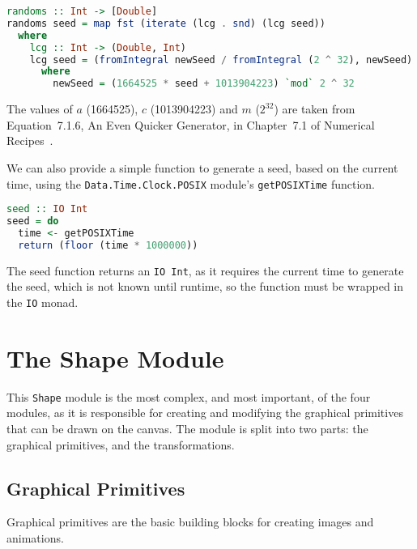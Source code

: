 \documentclass[../main.tex]{subfiles}
\begin{document}
            \begin{lstlisting}[language=Haskell, label={lst:random}, caption={The random number
                generator, which uses a linear congruential generator to generate an infinite
                list of pseudo-random numbers, mapped to the range [0, 1].}]
randoms :: Int -> [Double]
randoms seed = map fst (iterate (lcg . snd) (lcg seed))
  where
    lcg :: Int -> (Double, Int)
    lcg seed = (fromIntegral newSeed / fromIntegral (2 ^ 32), newSeed)
      where
        newSeed = (1664525 * seed + 1013904223) `mod` 2 ^ 32\end{lstlisting}

            The values of $a$ (1664525), $c$ (1013904223) and $m$ ($2^32$) are taken from
                Equation~7.1.6, An Even Quicker Generator, in Chapter~7.1 of Numerical
                Recipes~\citep{numericalRecipes}.

            We can also provide a simple function to generate a seed, based on the current
                time, using the \verb|Data.Time.Clock.POSIX| module's \verb|getPOSIXTime|
                function.

            \begin{lstlisting}[language=Haskell, label={lst:seed}, caption={The seed function.}]
seed :: IO Int
seed = do
  time <- getPOSIXTime
  return (floor (time * 1000000))\end{lstlisting}

            The seed function returns an \verb|IO Int|, as it requires the current time to
                generate the seed, which is not known until runtime, so the function must be
                wrapped in the \verb|IO| monad.

    \section{The Shape Module}
        This \verb|Shape| module is the most complex, and most important, of the four
            modules, as it is responsible for creating and modifying the graphical
            primitives that can be drawn on the canvas.
        The module is split into two parts: the graphical primitives, and the
            transformations.

        \subsection{Graphical Primitives}
            Graphical primitives are the basic building blocks for creating images and
                animations.
\end{document}
